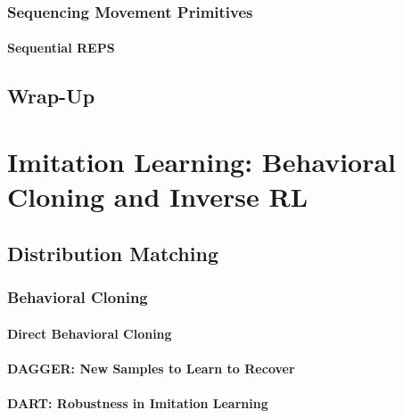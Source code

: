 		\subsection{Sequencing Movement Primitives} %

			\subsubsection{Sequential REPS} %

	\section{Wrap-Up} %

\chapter{Imitation Learning: Behavioral Cloning and Inverse RL} %

	\section{Distribution Matching} %

		\subsection{Behavioral Cloning} %

			\subsubsection{Direct Behavioral Cloning} %

			\subsubsection{DAGGER: New Samples to Learn to Recover} %

			\subsubsection{DART: Robustness in Imitation Learning} %

